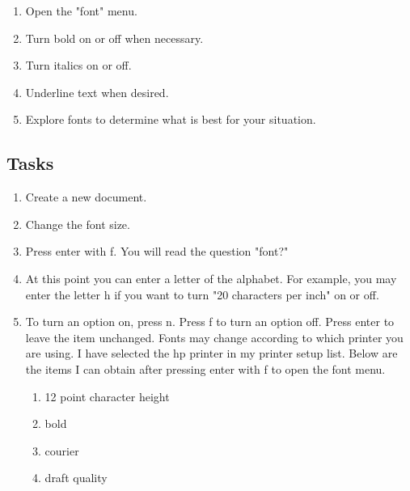 \documentclass[10pt,letterpaper,twoside]{report}
\begin{document}
{{{{\begin{enumerate}
	\item Open the "font" menu.
	      
	\item Turn bold on or off when necessary.
	      
	\item Turn italics on or off.
	      
	\item Underline text when desired.
	      
	\item Explore fonts to determine what is best for your situation.
\end{enumerate}



 \subsection{Tasks}



\begin{enumerate}
	\item Create a new document.
	      
	\item Change the font size.
	      
	\item Press enter with f.  You will read the question "font?"
	      
	\item At this point you can enter a letter of the alphabet.  For example, you may enter the letter h if you want to turn "20 characters per inch" on or off.
	      
	\item To turn an option on, press n.  Press f to turn an option off.  Press enter to leave the item unchanged. Fonts may change according to which printer you are using.  I have selected the hp printer in my printer setup list.  Below are the items I can obtain after pressing enter with f to open the font menu.
	      
	      \begin{enumerate}
		      \item 12 point character height
		            
		      \item bold
		            
		      \item courier
		            
		      \item draft quality
		            

\end{enumerate}
\end{enumerate}}}}}
\end{document}
